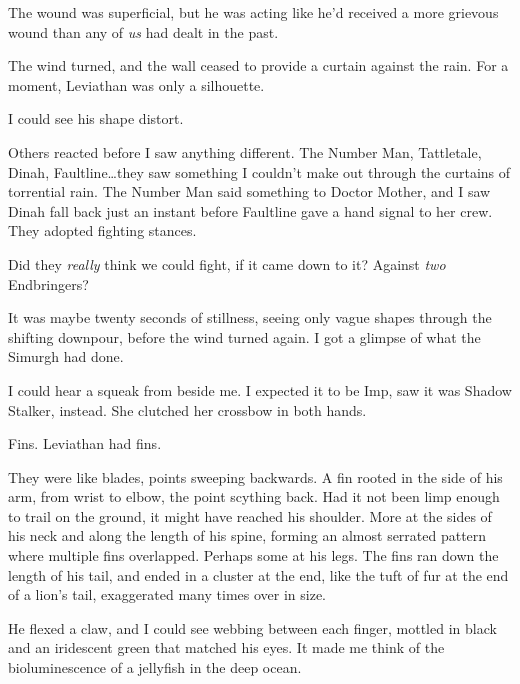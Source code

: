 The wound was superficial, but he was acting like he'd received a more grievous wound than any of \emph{us} had dealt in the past.



The wind turned, and the wall ceased to provide a curtain against the rain.  For a moment, Leviathan was only a silhouette.



I could see his shape distort.



Others reacted before I saw anything different.  The Number Man, Tattletale, Dinah, Faultline\ldots they saw something I couldn't make out through the curtains of torrential rain.  The Number Man said something to Doctor Mother, and I saw Dinah fall back just an instant before Faultline gave a hand signal to her crew.  They adopted fighting stances.



Did they \emph{really} think we could fight, if it came down to it?  Against \emph{two} Endbringers?



It was maybe twenty seconds of stillness, seeing only vague shapes through the shifting downpour, before the wind turned again.  I got a glimpse of what the Simurgh had done.



I could hear a squeak from beside me.  I expected it to be Imp, saw it was Shadow Stalker, instead.  She clutched her crossbow in both hands.



Fins.  Leviathan had fins.



They were like blades, points sweeping backwards.  A fin rooted in the side of his arm, from wrist to elbow, the point scything back.  Had it not been limp enough to trail on the ground, it might have reached his shoulder.  More at the sides of his neck and along the length of his spine, forming an almost serrated pattern where multiple fins overlapped.  Perhaps some at his legs.  The fins ran down the length of his tail, and ended in a cluster at the end, like the tuft of fur at the end of a lion's tail, exaggerated many times over in size.



He flexed a claw, and I could see webbing between each finger, mottled in black and an iridescent green that matched his eyes.  It made me think of the bioluminescence of a jellyfish in the deep ocean.



